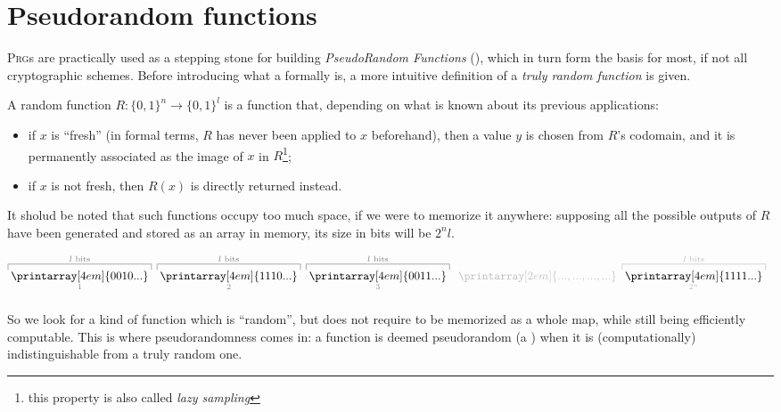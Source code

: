 \section{Pseudorandom functions}

\textsc{Prg}s are practically used as a stepping stone for building \emph{PseudoRandom Functions} (\prf), which in turn form the basis for most, if not all cryptographic schemes. Before introducing what a \prf{} formally is, a more intuitive definition of a \emph{truly random function} is given.

\begin{definition}
    A random function $R : \{0,1\}^{n} \to \{0,1\}^{l}$ is a function that, depending on what is known about its previous applications:

    \begin{itemize}
        \item if $x$ is ``fresh'' (in formal terms, $R$ has never been applied to $x$ beforehand), then a value $y$ is chosen \uar{} from $R$'s codomain, and it is permanently associated as the image of $x$ in $R$\footnote{this property is also called \emph{lazy sampling}};

        \item if $x$ is not fresh, then $R(x)$ is directly returned instead.
    \end{itemize}
\end{definition}

It sholud be noted that such functions occupy too much space, if we were to memorize it anywhere: supposing all the possible outputs of $R$ have been generated and stored as an array in memory, its size in bits will be $2^{n}l$.

\[  
    \color{black!50}%
    \overbracket[0.5pt][5pt]{{\thickspace}%
    \color{black}\printarray[4em]{0010...}\thickspace}^{l\textrm{ bits}}_{1}\thickspace%
    \overbracket[0.5pt][5pt]{{\thickspace}%
    \color{black}\printarray[4em]{1110...}\thickspace}^{l\textrm{ bits}}_{2}\thickspace%
    \overbracket[0.5pt][5pt]{{\thickspace}%
    \color{black}\printarray[4em]{0011...}\thickspace}^{l\textrm{ bits}}_{3}\thickspace%
    \color{black!25}\underbracket[0pt][5.5pt]{{\thickspace}%
    \printarray[2em]{...,...,...,...}\thickspace}_{}%
    \overbracket[0.5pt][5pt]{{\thickspace}%
    \color{black}\printarray[4em]{1111...}\thickspace}^{l\textrm{ bits}}_{2^{n}}\thickspace%
    \thickspace
\]

So we look for a kind of function which is ``random'', but does not require to be memorized as a whole map, while still being efficiently computable. This is where  pseudorandomness comes in: a function is deemed pseudorandom (a \prf) when it is (computationally) indistinguishable from a truly random one.

